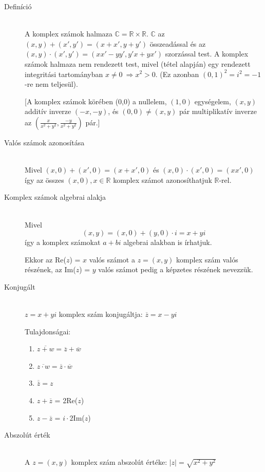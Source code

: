 \documentclass[margin=0px]{article}
\newcommand{\R}{\mathbb{R}}
\newcommand{\C}{\mathbb{C}}
\begin{document}
				\begin{description}
					\item[Definíció] \hfill \\
						A komplex számok halmaza $\C = \R \times \R$. $\C$ az $(x,y)+(x',y') = (x+x', y+y')$ összeadással és az $(x,y)\cdot(x',y') = (xx'-yy', y'x+yx')$ szorzással test. A komplex számok halmaza nem rendezett test, mivel (tétel alapján) egy rendezett integritási tartományban $ x \neq 0 \ \Rightarrow x^2 > 0$. (Ez azonban $(0,1)^2=i^2 = -1$-re nem teljesül). 
						
						[A komplex számok körében (0,0) a nullelem, $(1,0)$ egységelem, $(x,y)$ additív inverze $(-x,-y)$, és $(0,0) \neq (x,y)$ pár multiplikatív inverze az $(\frac{x}{x^2+y^2}, \frac{-y}{x^2+y^2})$ pár.]
					\item[Valós számok azonosítása] \hfill \\
						Mivel $(x,0)+(x',0) = (x+x',0)$ és $(x,0)\cdot(x',0) = (xx',0)$ így az összes $(x,0), x\in\R$ komplex számot azonosíthatjuk $\R$-rel.
					\item[Komplex számok algebrai alakja] \hfill \\
						Mivel
						\[(x,y) = (x,0)+(y,0)\cdot i = x+yi\]
						így a komplex számokat $a+bi$ algebrai alakban is írhatjuk.
						
						Ekkor az Re($z$) = $x$ valós számot a $z = (x,y)$ komplex szám valós részének, az Im($z$) = $y$ valós számot pedig a képzetes  részének nevezzük.
					\item[Konjugált] \hfill \\
						$ z = x+yi$ komplex szám konjugáltja: $\overline{z} = x-yi$
						
						Tulajdonságai:
						\begin{enumerate}
							\item $\overline{z+w} = \overline{z}+\overline{w}$
							\item $\overline{z\cdot w} = \overline{z}\cdot\overline{w}$
							\item $\overline{\overline{z}} = z$
							\item $z + \overline{z}$ = 2Re($z$)
							\item $z - \overline{z}$ = $i\cdot2$Im($z$)
						\end{enumerate}
					\item[Abszolút érték] \hfill \\
						A $z=(x,y)$ komplex szám abszolút értéke: $|z| = \sqrt{x^2+y^2}$
					

\end{description}
\end{document}
